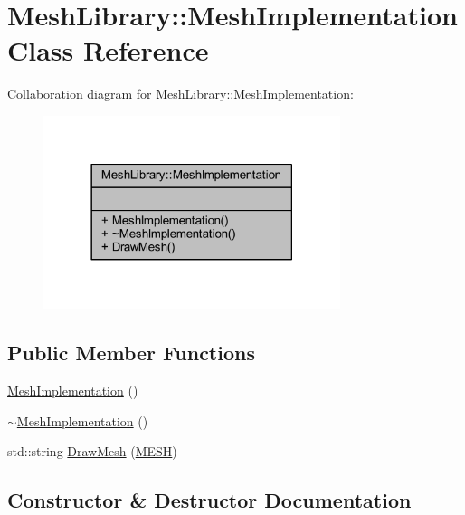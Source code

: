 \hypertarget{class_mesh_library_1_1_mesh_implementation}{}\section{Mesh\+Library\+::Mesh\+Implementation Class Reference}
\label{class_mesh_library_1_1_mesh_implementation}


Collaboration diagram for Mesh\+Library\+::Mesh\+Implementation\+:\nopagebreak
\begin{figure}[H]
\begin{center}
\leavevmode
\includegraphics[width=246pt]{class_mesh_library_1_1_mesh_implementation__coll__graph}
\end{center}
\end{figure}
\subsection*{Public Member Functions}
\begin{DoxyCompactItemize}
\item 
\mbox{\hyperlink{class_mesh_library_1_1_mesh_implementation_a30bf0486febd128770d515d1d13786c9}{Mesh\+Implementation}} ()
\item 
\mbox{\hyperlink{class_mesh_library_1_1_mesh_implementation_a45b38bb95065ad9ff258d63c60858ca9}{$\sim$\+Mesh\+Implementation}} ()
\item 
std\+::string \mbox{\hyperlink{class_mesh_library_1_1_mesh_implementation_a08e8294ed19a5f1269a73225db7704e5}{Draw\+Mesh}} (\mbox{\hyperlink{_p_i_m_p_l_2_p_i_m_p_l_2_commons_8h_a7d8bc2c54c2771e646f020b8420adafc}{M\+E\+SH}})
\end{DoxyCompactItemize}


\subsection{Constructor \& Destructor Documentation}
\mbox{\label{class_mesh_library_1_1_mesh_implementation_a30bf0486febd128770d515d1d13786c9}} 
